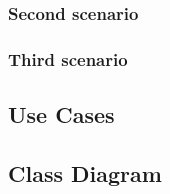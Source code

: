 \documentclass[12pt]{article}
\begin{document}
	\subsubsection{Second scenario}
	
	\FloatBarrier
	\clearpage
	\subsubsection{Third scenario}
	
	\FloatBarrier
	\clearpage
	\subsection{Use Cases}
	
	\subsection{Class Diagram}
	
\end{document}
